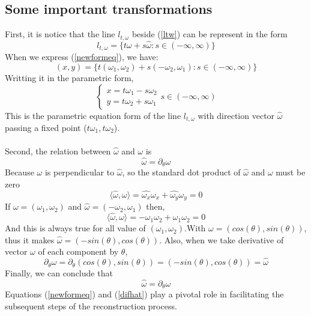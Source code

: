 \documentclass[a4paper]{article}
\begin{document}
\subsection{Some important transformations}
First, it is notice that the line $l_{t,\omega}$ beside (\ref{ltw}) can be represent in the form
\begin{equation}\label{newformeq}
    l_{t,\omega} = \{ t\omega + s\hat{\omega}: s \in (-\infty,\infty )\} 
\end{equation}
When we express (\ref{newformeq}), we have:
\begin{equation*}
    (x,y) = \{t(\omega_1,\omega_2) + s(-\omega_2,\omega_1) : s \in (-\infty,\infty )\}
\end{equation*}
Writting it in the parametric form,
\[\begin{cases}
    x=t\omega_1 - s\omega_2\\
    y=t\omega_2 + s\omega_1
\end{cases}
s\in (-\infty,\infty)\]
This is the parametric equation form of the line $l_{t,\omega}$ with direction vector $\hat{\omega}$ passing a fixed point ($t\omega_1,t\omega_2$).\\ \\
Second, the relation between $\hat{\omega}$ and $\omega$ is
\begin{equation}\label{difhat}
    \hat{\omega} = \partial_\theta\omega 
\end{equation}
Because $\omega$ is perpendicular to $\hat{\omega}$, so the standard dot product of $\hat{\omega}$ and $\omega$ must be zero
\begin{equation*}
    \langle \hat{\omega},\omega \rangle = \hat{\omega_x}\omega_x + \hat{\omega_y}\omega_y = 0
\end{equation*}
If $\omega = (\omega_1,\omega_2)$ and $\hat{\omega} = (-\omega_2,\omega_1)$ then,
\begin{equation*}
    \langle \hat{\omega},\omega \rangle = -\omega_1\omega_2 + \omega_1\omega_2 = 0
\end{equation*}
And this is always true for all value of $(\omega_1,\omega_2)$.With $\omega = (cos(\theta),sin(\theta))$, thus it makes $\hat{\omega} = (-sin(\theta),cos(\theta))$. Also, when we take derivative of vector $\omega$ of each component by $\theta$,
\begin{equation*}
    \partial_\theta\omega = \partial_\theta(cos(\theta),sin(\theta)) = (-sin(\theta),cos(\theta)) = \hat{\omega}
\end{equation*}
Finally, we can conclude that
\begin{equation*}
    \hat{\omega} = \partial_\theta\omega 
\end{equation*}
Equations (\ref{newformeq}) and (\ref{difhat}) play a pivotal role in facilitating the subsequent steps of the reconstruction process. 
\end{document}
